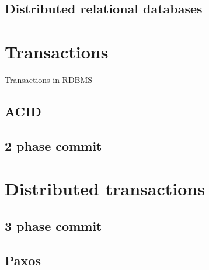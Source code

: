 
\subsection{Distributed relational databases}






\section{Transactions}\label{sec:theory:transactions}
Transactions in RDBMS

\subsection{ACID}

\subsection{2 phase commit}

\section{Distributed transactions}


\subsection{3 phase commit}\label{sec:theory:transactions:3pc}

\subsection{Paxos}




